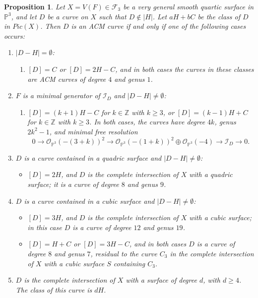 \documentclass[12pt,reqno]{amsart}
\theoremstyle{plain}
\newtheorem{prop}[theorem]{Proposition}
\theoremstyle{definition}
\theoremstyle{remark}
\theoremstyle{definition}
\newcommand{\PP}{\mathds{P}}
\newcommand{\PPP}{\PP^{3}}
\newcommand{\ii}{\mathscr{I}}
\newcommand{\oo}{\mathcal{O}}
\begin{document}
\begin{prop}
Let $X=V(F)\in\mathcal{F}_{3}$ be a very general smooth quartic surface in $\PPP$, and let $D$ be a curve on $X$ such that $D\notin |H|$. Let $aH+bC$ be the class of $D$ in $Pic(X)$. Then $D$ is an ACM curve if and only if one of the following cases occurs:
\begin{enumerate}[label=(\roman*)]
    \item $|D-H|=\emptyset$:
    \begin{enumerate}
        \item[(a)] $[D]=C$ or $[D]=2H-C$, and in both cases the curves in these classes are ACM curves of degree $4$ and genus $1$.
    \end{enumerate}

    \item $F$ is a minimal generator of $\ii_{D}$ and $|D-H|\neq\emptyset$:
    \begin{enumerate}
        \item[(a)] $[D]=(k+1)H-C$ for $k\in\mathds{Z}$ with $k\geq3$, or $[D]=(k-1)H+C$ for $k\in\mathds{Z}$ with $k\geq3$.  
        In both cases, the curves have degree $4k$, genus $2k^{2}-1$, and minimal free resolution
        \[
        0\to \oo_{\PPP}(-(3+k))^{2}
        \to \oo_{\PPP}(-(1+k))^{2}\oplus \oo_{\PPP}(-4)
        \to \ii_{D}\to 0.
        \]
    \end{enumerate}

    \item $D$ is a curve contained in a quadric surface and $|D-H|\neq\emptyset$:
    \begin{itemize}
        \item[(a)] $[D]=2H$, and $D$ is the complete intersection of $X$ with a quadric surface; it is a curve of degree $8$ and genus $9$.
    \end{itemize}

    \item $D$ is a curve contained in a cubic surface and $|D-H|\neq\emptyset$:
    \begin{itemize}
        \item[(a)] $[D]=3H$, and $D$ is the complete intersection of $X$ with a cubic surface; in this case $D$ is a curve of degree $12$ and genus $19$.
        \item[(b)] $[D]=H+C$ or $[D]=3H-C$, and in both cases $D$ is a curve of degree $8$ and genus $7$, residual to the curve $C_{3}$ in the complete intersection of $X$ with a cubic surface $S$ containing $C_{3}$.
    \end{itemize}

    \item $D$ is the complete intersection of $X$ with a surface of degree $d$, with $d\geq4$. The class of this curve is $dH$.
\end{enumerate}
\end{prop}
\end{document}
